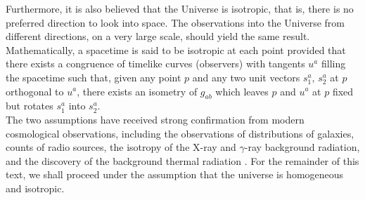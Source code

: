 \documentclass[11pt]{article}
\theoremstyle{break}
\theoremstyle{break}
\begin{document}
Furthermore, it is also believed that the Universe is isotropic, that is, there is no preferred direction to look into space. The observations into the Universe from different directions, on a very large scale, should yield the same result. Mathematically, a spacetime is said to be isotropic at each point provided that there exists a congruence of timelike curves (observers) with tangents $u^a$ filling the spacetime such that, given any point $p$ and any two unit vectors $s_1^a,\,s_2^a$ at $p$ orthogonal to $u^a$, there exists an isometry of $g_{ab}$ which leaves $p$ and $u^a$ at $p$ fixed but rotates $s_1^a$ into $s_2^a$. \\

The two assumptions have received strong confirmation from modern cosmological observations, including the observations of distributions of galaxies, counts of radio sources, the isotropy of the X-ray and $\gamma$-ray background radiation, and the discovery of the background thermal radiation \cite{Nathalie, Wald}. For the remainder of this text, we shall proceed under the assumption that the universe is homogeneous and isotropic.\\
\end{document}
